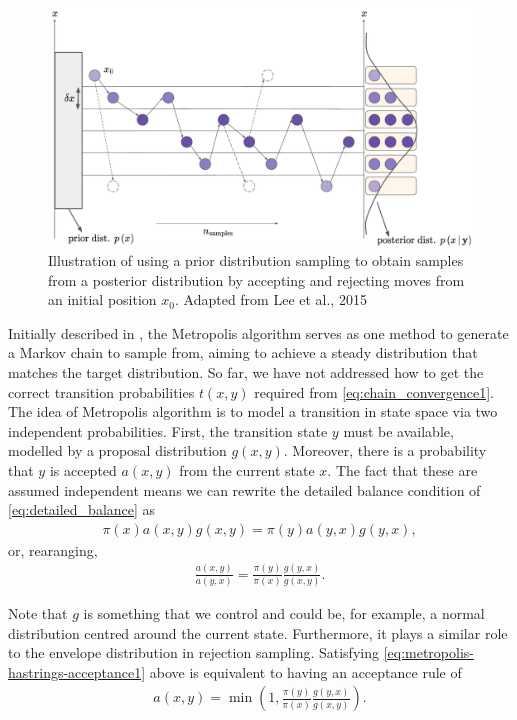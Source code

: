\begin{figure}[h]
    \centering
    \includegraphics[width=0.8\linewidth]{Chapters/Theoretical_Background/images/metropolis.pdf}
    \caption{Illustration of using a prior distribution sampling to obtain samples from a posterior distribution by accepting and rejecting moves from an initial position $x_0$. Adapted from Lee et al., 2015 \cite{lee2015metamodel}}
    \label{fig:sampling_metropolis}
\end{figure}

Initially described in \cite{metropolisEquationStateCalculations1953}, the Metropolis algorithm serves as one method to generate a Markov chain to sample from, aiming to achieve a steady distribution that matches the target distribution. So far, we have not addressed how to get the correct transition probabilities $t(x, y)$ required from \eqref{eq:chain_convergence1}. The idea of Metropolis algorithm is to model a transition in state space via two independent probabilities. First, the transition state $y$ must be available, modelled by a proposal distribution $g(x,y)$. Moreover, there is a probability that $y$ is accepted $a(x,y)$ from the current state $x$. The fact that these are assumed independent means we can rewrite the detailed balance condition of \eqref{eq:detailed_balance} as
\begin{align*}
    \pi(x)a(x, y)g(x,y) = \pi(y)a(y, x)g(y,x),
\end{align*}
or, rearanging, 
\begin{align}
    \frac{a(x, y)}{a(y, x)} = \frac{\pi(y)}{\pi(x)}\frac{g(y,x)}{g(x,y)}.
    \label{eq:metropolis-hastrings-acceptance1}
\end{align}

Note that $g$ is something that we control and could be, for example, a normal distribution centred around the current state. Furthermore, it plays a similar role to the envelope distribution in rejection sampling. Satisfying \eqref{eq:metropolis-hastrings-acceptance1} above is equivalent to having an acceptance rule of
\begin{align}
    a(x, y) = \min\left(1, \frac{\pi(y)}{\pi(x)}\frac{g(y,x)}{g(x,y)}\right).
    \label{eq:metropolis-hastrings-acceptance2}
\end{align}

